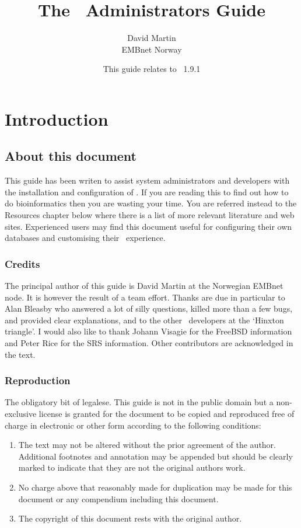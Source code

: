 \documentclass{report}
\begin{document}
\title{The \EMBOSS\ Administrators Guide}
\author{David Martin \\ EMBnet Norway}
\date{This guide relates to \EMBOSS\ 1.9.1}

\maketitle
\tableofcontents

\chapter{Introduction}
\section{About this document}
This guide has been writen to assist system administrators and developers with the installation and configuration of \EMBOSS. If you are reading this to find out how to do bioinformatics then you are wasting your time. You are referred instead to the Resources chapter below where there is a list of more relevant literature and web sites. 
Experienced users may find this document useful for configuring their own 
databases and customising their \EMBOSS\ experience.


\subsection{Credits}
The principal author of this guide is David Martin 
at the Norwegian EMBnet node. It is however the 
result of a team effort. Thanks are due in particular to Alan Bleasby who 
answered a lot of silly questions, killed more than a few bugs, and provided 
clear explanations, and to the other \EMBOSS\ developers at the `Hinxton 
triangle'. I would also like to thank Johann Visagie for the FreeBSD 
information and Peter Rice for the SRS information. Other contributors are 
acknowledged in the text. 

\subsection{Reproduction}
The obligatory bit of legalese. This guide is not in the public domain but a 
non-exclusive license is granted for the document to be copied and reproduced 
free of charge in electronic or other form according to the following 
conditions:
\begin{enumerate}
\item The text may not be altered without the prior agreement of the author. 
Additional footnotes and annotation may be appended but should be clearly 
marked to indicate that they are not the original authors work.
\item No charge above that reasonably made for duplication may be made for 
this document or any compendium including this document.
\item The copyright of this document rests with the original author.
\end{enumerate}
\end{document}
